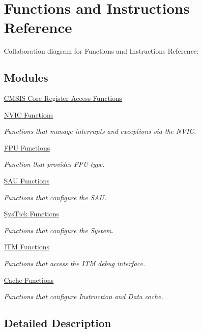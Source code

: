 \hypertarget{group___c_m_s_i_s___core___function_interface}{}\section{Functions and Instructions Reference}
\label{group___c_m_s_i_s___core___function_interface}
Collaboration diagram for Functions and Instructions Reference\+:
\subsection*{Modules}
\begin{DoxyCompactItemize}
\item 
\hyperlink{group___c_m_s_i_s___core___reg_acc_functions}{C\+M\+S\+I\+S Core Register Access Functions}
\item 
\hyperlink{group___c_m_s_i_s___core___n_v_i_c_functions}{N\+V\+I\+C Functions}
\begin{DoxyCompactList}\small\item\em Functions that manage interrupts and exceptions via the N\+V\+IC. \end{DoxyCompactList}\item 
\hyperlink{group___c_m_s_i_s___core___fpu_functions}{F\+P\+U Functions}
\begin{DoxyCompactList}\small\item\em Function that provides F\+PU type. \end{DoxyCompactList}\item 
\hyperlink{group___c_m_s_i_s___core___s_a_u_functions}{S\+A\+U Functions}
\begin{DoxyCompactList}\small\item\em Functions that configure the S\+AU. \end{DoxyCompactList}\item 
\hyperlink{group___c_m_s_i_s___core___sys_tick_functions}{Sys\+Tick Functions}
\begin{DoxyCompactList}\small\item\em Functions that configure the System. \end{DoxyCompactList}\item 
\hyperlink{group___c_m_s_i_s__core___debug_functions}{I\+T\+M Functions}
\begin{DoxyCompactList}\small\item\em Functions that access the I\+TM debug interface. \end{DoxyCompactList}\item 
\hyperlink{group___c_m_s_i_s___core___cache_functions}{Cache Functions}
\begin{DoxyCompactList}\small\item\em Functions that configure Instruction and Data cache. \end{DoxyCompactList}\end{DoxyCompactItemize}


\subsection{Detailed Description}
